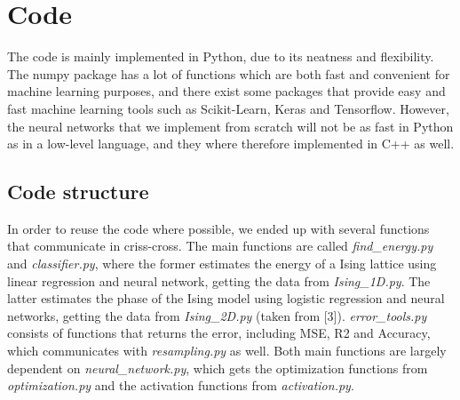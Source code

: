 \section{Code} \label{sec:code}
The code is mainly implemented in Python, due to its neatness and flexibility. The numpy package has a lot of functions which are both fast and convenient for machine learning purposes, and there exist some packages that provide easy and fast machine learning tools such as Scikit-Learn, Keras and Tensorflow. However, the neural networks that we implement from scratch will not be as fast in Python as in a low-level language, and they where therefore implemented in C++ as well. 

\subsection{Code structure} \label{sec:structure}
In order to reuse the code where possible, we ended up with several functions that communicate in criss-cross. The main functions are called \textit{find\_energy.py} and \textit{classifier.py}, where the former estimates the energy of a Ising lattice using linear regression and neural network, getting the data from \textit{Ising\_1D.py}. The latter estimates the phase of the Ising model using logistic regression and neural networks, getting the data from \textit{Ising\_2D.py} (taken from [3]). \textit{error\_tools.py} consists of functions that returns the error, including MSE, R2 and Accuracy, which communicates with \textit{resampling.py} as well. Both main functions are largely dependent on \textit{neural\_network.py}, which gets the optimization functions from \textit{optimization.py} and the activation functions from \textit{activation.py}.

